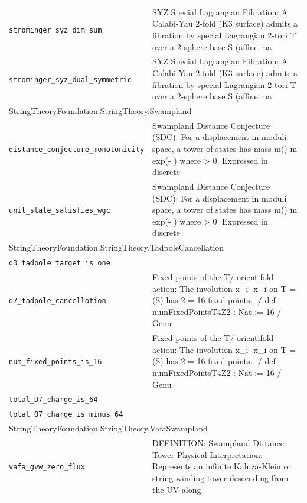 \begin{longtable}{p{}p{}}
\quad\texttt{\footnotesize strominger\_syz\_dim\_sum} & {\footnotesize SYZ Special Lagrangian Fibration: A Calabi-Yau 2-fold (K3 surface) admits a fibration by special Lagrangian 2-tori T over a 2-sphere base S (affine ma} \\
\quad\texttt{\footnotesize strominger\_syz\_dual\_symmetric} & {\footnotesize SYZ Special Lagrangian Fibration: A Calabi-Yau 2-fold (K3 surface) admits a fibration by special Lagrangian 2-tori T over a 2-sphere base S (affine ma} \\
\multicolumn{2}{l}{\textsf{\small StringTheoryFoundation.StringTheory.Swampland}} \\
\quad\texttt{\footnotesize distance\_conjecture\_monotonicity} & {\footnotesize Swampland Distance Conjecture (SDC): For a displacement  in moduli space, a tower of states has mass m()  m  exp(- ) where  > 0. Expressed in discrete} \\
\quad\texttt{\footnotesize unit\_state\_satisfies\_wgc} & {\footnotesize Swampland Distance Conjecture (SDC): For a displacement  in moduli space, a tower of states has mass m()  m  exp(- ) where  > 0. Expressed in discrete} \\
\multicolumn{2}{l}{\textsf{\small StringTheoryFoundation.StringTheory.TadpoleCancellation}} \\
\quad\texttt{\footnotesize d3\_tadpole\_target\_is\_one} & {\footnotesize } \\
\quad\texttt{\footnotesize d7\_tadpole\_cancellation} & {\footnotesize Fixed points of the T/ orientifold action: The involution x\_i  -x\_i on T = (S) has 2 = 16 fixed points. -/ def numFixedPointsT4Z2 : Nat := 16 /-- Genu} \\
\quad\texttt{\footnotesize num\_fixed\_points\_is\_16} & {\footnotesize Fixed points of the T/ orientifold action: The involution x\_i  -x\_i on T = (S) has 2 = 16 fixed points. -/ def numFixedPointsT4Z2 : Nat := 16 /-- Genu} \\
\quad\texttt{\footnotesize total\_D7\_charge\_is\_64} & {\footnotesize } \\
\quad\texttt{\footnotesize total\_O7\_charge\_is\_minus\_64} & {\footnotesize } \\
\multicolumn{2}{l}{\textsf{\small StringTheoryFoundation.StringTheory.VafaSwampland}} \\
\quad\texttt{\footnotesize vafa\_gvw\_zero\_flux} & {\footnotesize DEFINITION: Swampland Distance Tower Physical Interpretation: Represents an infinite Kaluza-Klein or string winding tower descending from the UV along} \\

\end{longtable}
